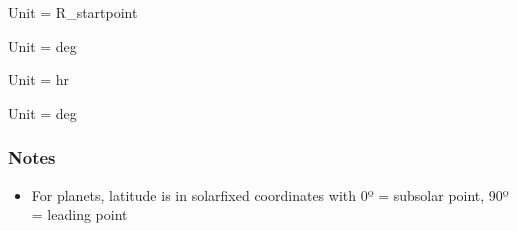 \documentclass[letterpaper,10pt,english]{sphinxmanual}
\begin{document}
\begin{fulllineitems}
\begin{fulllineitems}
\begin{fulllineitems}
\pysigstartsignatures
\pysigline
{}
\pysigstopsignatures
\sphinxAtStartPar
Unit = R\_startpoint

\end{fulllineitems}



\begin{fulllineitems}

\pysigstartsignatures
\pysigline
{}
\pysigstopsignatures
\end{fulllineitems}



\begin{fulllineitems}

\pysigstartsignatures
\pysigline
{}
\pysigstopsignatures
\sphinxAtStartPar
Unit = deg

\end{fulllineitems}


\begin{fulllineitems}
\label{\detokenize{nexoclom2/nexoclom2.particle_tracking.starting_point_old:id1}}
\pysigstartsignatures
\pysigline
{}
\pysigstopsignatures
\sphinxAtStartPar
Unit = hr

\end{fulllineitems}



\begin{fulllineitems}

\pysigstartsignatures
\pysigline
{}
\pysigstopsignatures
\sphinxAtStartPar
Unit = deg

\end{fulllineitems}

\subsubsection*{Notes}
\begin{itemize}
\item {} 
\sphinxAtStartPar
For planets, latitude is in solar\sphinxhyphen{}fixed coordinates with
0º = subsolar point, 90º = leading point


\end{itemize}
\end{fulllineitems}
\end{fulllineitems}
\end{document}
